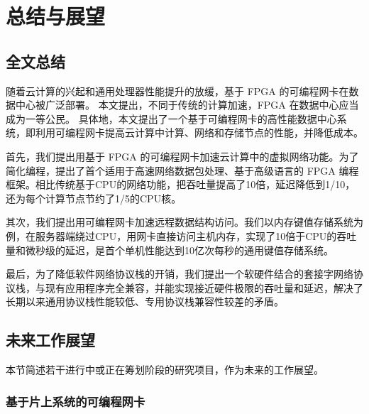 \chapter{总结与展望}

\section{全文总结}

随着云计算的兴起和通用处理器性能提升的放缓，基于 FPGA 的可编程网卡在数据中心被广泛部署。
本文提出，不同于传统的计算加速，FPGA 在数据中心应当成为一等公民。
具体地，本文提出了一个基于可编程网卡的高性能数据中心系统，即利用可编程网卡提高云计算中计算、网络和存储节点的性能，并降低成本。

首先，我们提出用基于 FPGA 的可编程网卡加速云计算中的虚拟网络功能。为了简化编程，提出了首个适用于高速网络数据包处理、基于高级语言的 FPGA 编程框架。相比传统基于CPU的网络功能，把吞吐量提高了10倍，延迟降低到1/10，还为每个计算节点节约了1/5的CPU核。

其次，我们提出用可编程网卡加速远程数据结构访问。我们以内存键值存储系统为例，在服务器端绕过CPU，用网卡直接访问主机内存，实现了10倍于CPU的吞吐量和微秒级的延迟，是首个单机性能达到10亿次每秒的通用键值存储系统。

最后，为了降低软件网络协议栈的开销，我们提出一个软硬件结合的套接字网络协议栈，与现有应用程序完全兼容，并能实现接近硬件极限的吞吐量和延迟，解决了长期以来通用协议栈性能较低、专用协议栈兼容性较差的矛盾。

\section{未来工作展望}

本节简述若干进行中或正在筹划阶段的研究项目，作为未来的工作展望。

\subsection{基于片上系统的可编程网卡}


